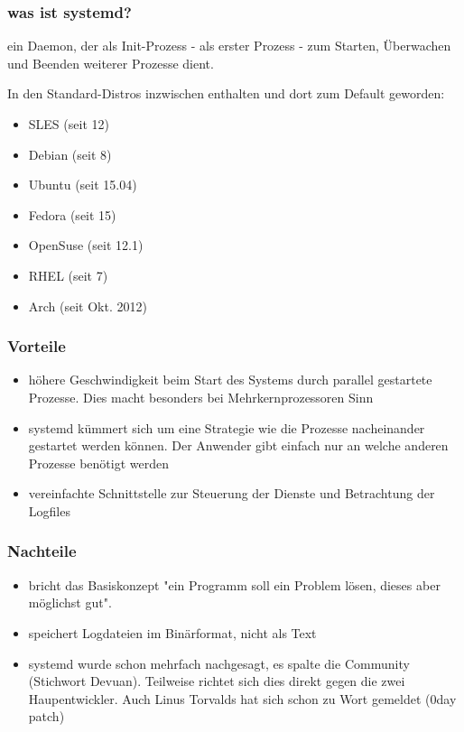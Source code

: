 
\begin{frame}
\frametitle{was ist systemd?}
ein Daemon, der als Init-Prozess - als erster Prozess - zum Starten, Überwachen
und Beenden weiterer Prozesse dient.

In den Standard-Distros inzwischen enthalten und dort zum Default geworden:

\begin{itemize}
  \item SLES (seit 12)
  \item Debian (seit 8)
  \item Ubuntu (seit 15.04)
  \item Fedora (seit 15)
  \item OpenSuse (seit 12.1)
  \item RHEL (seit 7)
  \item Arch (seit Okt. 2012)
\end{itemize}

\end{frame}

\begin{frame}
  \frametitle{Vorteile}
  \begin{itemize}
    \item höhere Geschwindigkeit beim Start des Systems durch parallel gestartete
          Prozesse. Dies macht besonders bei Mehrkernprozessoren Sinn
    \item systemd kümmert sich um eine Strategie wie die Prozesse nacheinander
          gestartet werden können. Der Anwender gibt einfach nur an welche anderen Prozesse benötigt werden
    \item vereinfachte Schnittstelle zur Steuerung der Dienste und Betrachtung der Logfiles
  \end{itemize}
\end{frame}

\begin{frame}
  \frametitle{Nachteile}
  \begin{itemize}
    \item bricht das Basiskonzept "ein Programm soll ein Problem lösen, dieses aber möglichst gut". 
    \item speichert Logdateien im Binärformat, nicht als Text
    \item systemd wurde schon mehrfach nachgesagt, es spalte die Community (Stichwort Devuan). Teilweise richtet
  sich dies direkt gegen die zwei Haupentwickler. Auch Linus Torvalds hat sich schon zu Wort gemeldet (0day patch)
  \end{itemize}

\end{frame}

